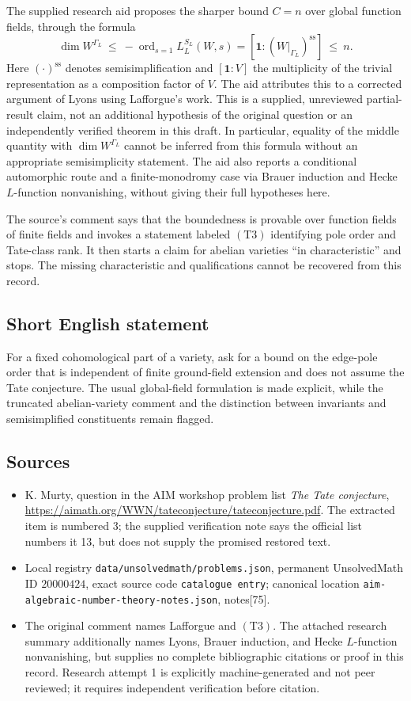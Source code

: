 \documentclass[11pt]{article}
\begin{document}
The supplied research aid proposes the sharper bound \(C=n\) over global function fields, through the formula
\[
\dim W^{\Gamma_L}\ \leq\ -\operatorname{ord}_{s=1}L^{S_L}_L(W,s)
=[\mathbf 1:(W|_{\Gamma_L})^{\mathrm{ss}}]\ \leq\ n.
\]
Here \((\cdot)^{\mathrm{ss}}\) denotes semisimplification and \([\mathbf 1:V]\) the multiplicity of the trivial representation as a composition factor of \(V\). The aid attributes this to a corrected argument of Lyons using Lafforgue's work. This is a supplied, unreviewed partial-result claim, not an additional hypothesis of the original question or an independently verified theorem in this draft. In particular, equality of the middle quantity with \(\dim W^{\Gamma_L}\) cannot be inferred from this formula without an appropriate semisimplicity statement. The aid also reports a conditional automorphic route and a finite-monodromy case via Brauer induction and Hecke \(L\)-function nonvanishing, without giving their full hypotheses here.

The source's comment says that the boundedness is provable over function fields of finite fields and invokes a statement labeled \((\mathrm{T3})\) identifying pole order and Tate-class rank. It then starts a claim for abelian varieties ``in characteristic'' and stops. The missing characteristic and qualifications cannot be recovered from this record.
\subsection{Short English statement}
For a fixed cohomological part of a variety, ask for a bound on the edge-pole order that is independent of finite ground-field extension and does not assume the Tate conjecture. The usual global-field formulation is made explicit, while the truncated abelian-variety comment and the distinction between invariants and semisimplified constituents remain flagged.
\subsection{Sources}
\begin{itemize}
\item K. Murty, question in the AIM workshop problem list \emph{The Tate conjecture}, \url{https://aimath.org/WWN/tateconjecture/tateconjecture.pdf}. The extracted item is numbered 3; the supplied verification note says the official list numbers it 13, but does not supply the promised restored text.
\item Local registry \texttt{data/unsolvedmath/problems.json}, permanent UnsolvedMath ID \(20000424\), exact source code \texttt{catalogue entry}; canonical location \texttt{aim-algebraic-number-theory-notes.json}, notes[75].
\item The original comment names Lafforgue and \((\mathrm{T3})\). The attached research summary additionally names Lyons, Brauer induction, and Hecke \(L\)-function nonvanishing, but supplies no complete bibliographic citations or proof in this record. Research attempt 1 is explicitly machine-generated and not peer reviewed; it requires independent verification before citation.
\end{itemize}
\end{document}
